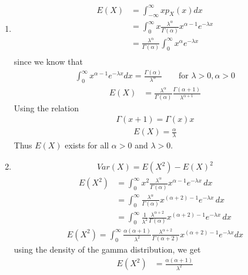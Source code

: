 \documentclass[journal,12pt,twocolumn]{IEEEtran}
\theoremstyle{remark}
\begin{document}
\begin{enumerate}
\item
{
\begin{align}
E(X)&= \int_{-\infty}^{\infty} xp_X(x)dx\\
&= \int_{0}^{\infty} x\frac{\lambda^{\alpha}}{\Gamma(\alpha)}x^{\alpha - 1} e^{-\lambda x}\\
&= \frac{\lambda^{\alpha}}{\Gamma(\alpha)} \int_{0}^{\infty}x^{\alpha} e^{-\lambda x}\\
\end{align}
since we know that 
\begin{align}
\int_0^\infty x^{\alpha - 1} e^{-\lambda x} dx = \frac{\Gamma(\alpha)}{\lambda^{\alpha}} \qquad \textrm{for } \lambda > 0, \alpha>0
\end{align}
\begin{align}
E(X)&= \frac{\lambda^{\alpha}}{\Gamma(\alpha)}\frac{\Gamma(\alpha+1)}{\lambda^{\alpha+1}}
\end{align}
Using the relation
\begin{align}
\Gamma(x+1) = \Gamma(x) x
\end{align}
\begin{align}
E(X)=\frac{\alpha}{\lambda}
\end{align}
Thus $E(X)$ exists for all $\alpha > 0 $ and $ \lambda > 0$.
}
\item{
\begin{align}
{Var}(X) = {E}(X^2) - {E}(X)^2 
\end{align}
\begin{align}
{E}(X^2) &= \int_{0}^{\infty} x^2 \frac{{\lambda}^{\alpha}}{\Gamma({\alpha})} x^{{\alpha}-1} e^{-{\lambda}x} \, {d}x \\
&=\int_{0}^{\infty} \frac{{\lambda}^{\alpha}}{\Gamma({\alpha})} x^{({\alpha}+2)-1} e^{-{\lambda}x} \, {d}x \\
&=\int_{0}^{\infty} \frac{1}{{\lambda}^2} \frac{{\lambda}^{{\alpha}+2}}{\Gamma({\alpha})} x^{({\alpha}+2)-1} e^{-{\lambda}x} \, {d}x 
\end{align}
\begin{align}
{E}(X^2) = \int_{0}^{\infty} \frac{{\alpha}({\alpha}+1)}{{\lambda}^2}  \frac{{\lambda}^{{\alpha}+2}}{\Gamma({\alpha}+2)} x^{({\alpha}+2)-1} e^{-{\lambda}x}{d}x
\end{align}
using the density of the gamma distribution, we get
\begin{align}
{E}(X^2) &= \frac{{\alpha}({\alpha}+1)}{{\lambda}^2} 
\end{align}
\begin{align}

\end{align}}
\end{enumerate}
\end{document}
